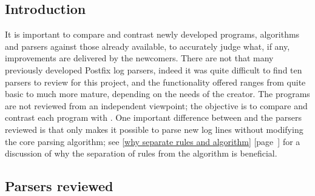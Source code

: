 \documentclass[a4paper,12pt,draft]{article}
\newcommand{\parsername}{\PLP{}}
\newcommand{\refwithpage}[1]{%
    \empty{}\ref{#1} [page~\pageref{#1}]%
}
\newcommand{\sectionref}[1]{%
    \textsection{}\refwithpage{#1}%
}
\begin{document}
\label{other-parsers}

\subsection{Introduction}

It is important to compare and contrast newly developed programs,
algorithms and parsers against those already available, to accurately judge
what, if any, improvements are delivered by the newcomers.  There are not
that many previously developed Postfix log parsers, indeed it was quite
difficult to find ten parsers to review for this project, and the
functionality offered ranges from quite basic to much more mature,
depending on the needs of the creator.  The programs are not reviewed from
an independent viewpoint; the objective is to compare and contrast each
program with \parsername{}.  One important difference between \parsername{}
and the parsers reviewed is that only \parsername{} makes it possible to
parse new log lines without modifying the core parsing algorithm; see
\sectionref{why separate rules and algorithm} for a discussion of why the
separation of rules from the algorithm is beneficial.


\subsection{Parsers reviewed}
\end{document}
